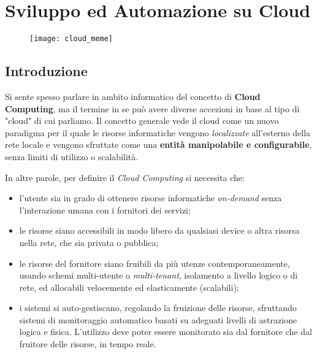 \documentclass[../main.tex]{subfiles}
\begin{document}
    \chapter{Sviluppo ed Automazione su Cloud}
	
    \begin{figure}[h]
		\centering
		\texttt{[image: cloud\_meme]}
    \end{figure}

        \section{Introduzione}
        
            Si sente spesso parlare in ambito informatico del concetto di \textbf{Cloud Computing}, ma il termine in se può avere diverse accezioni in base al tipo di "cloud" di cui parliamo. Il concetto generale vede il cloud come un nuovo paradigma per il quale le risorse informatiche vengono \emph{localizzate} all'esterno della rete locale e vengono sfruttate come una \textbf{entità manipolabile e configurabile}, senza limiti di utilizzo o scalabilità.
            
            In altre parole, per definire il \emph{Cloud Computing} si necessita che:
            \begin{itemize}
                \item l'utente sia in grado di ottenere risorse informatiche \emph{on-demand} senza l'interazione umana con i fornitori dei servizi;
                \item le risorse siano accessibili in modo libero da qualsiasi device o altra risorsa nella rete, che sia privata o pubblica;
                \item le risorse del fornitore siano fruibili da più utenze contemporaneamente, usando schemi multi-utente o \emph{multi-tenant}, isolamento a livello logico o di rete, ed allocabili velocemente ed elasticamente (scalabili);
                \item i sistemi si auto-gestiscano, regolando la fruizione delle risorse, sfruttando sistemi di monitoraggio automatico basati su adeguati livelli di astrazione logica e fisica. L'utilizzo deve poter essere monitorato sia dal fornitore che dal fruitore delle risorse, in tempo reale.
            \end{itemize}
    	    
\end{document}
